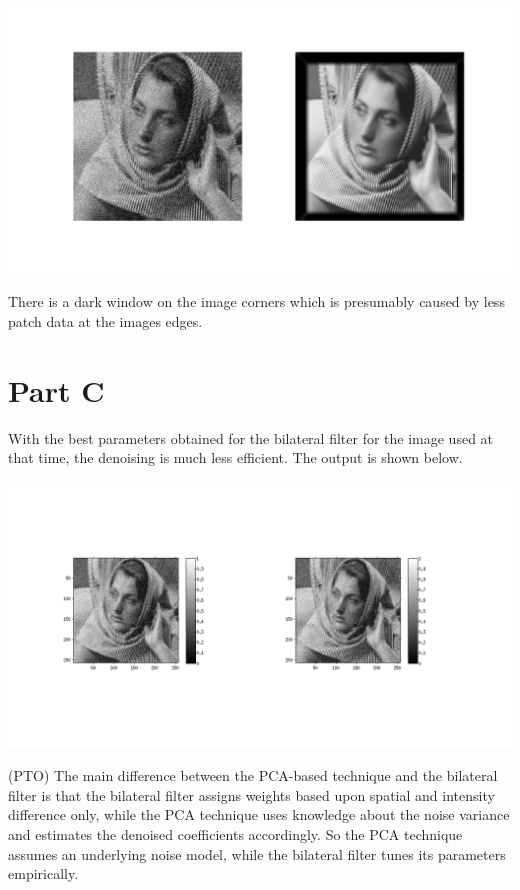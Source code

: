 \documentclass[10pt]{report}
\begin{document}
\includegraphics[scale=0.35]{out2}

There is a dark window on the image corners which is presumably caused by less patch data at the images edges.

\section*{Part C}
With the best parameters obtained for the bilateral filter for the image used at that time, the denoising is much less efficient. The output is shown below.

\includegraphics[scale=0.35]{out3}

(PTO)
\newpage
The main difference between the PCA-based technique and the bilateral filter is that the bilateral filter assigns weights based upon spatial and intensity difference only, while the PCA technique uses knowledge about the noise variance and estimates the denoised coefficients accordingly. So the PCA technique assumes an underlying noise model, while the bilateral filter tunes its parameters empirically.
\end{document}
